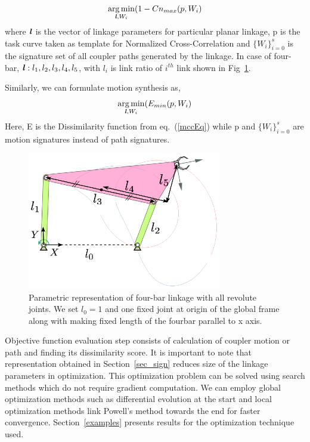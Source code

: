 \documentclass[twocolumn,10pt]{asme2e}
\newcommand{\req}[1]{(\ref{#1})}
\DeclareMathOperator*{\argminA}{arg\,min}
\begin{document}
\begin{equation}\label{objectiveFunPath}
  \argminA_{\textbf{\emph{l}}, W_i} (1 - Cn_{max}(p, W_i)
\end{equation}
where $\textbf{\emph{l}}$ is the vector of linkage parameters for particular planar linkage, p is the task curve taken as template for Normalized Cross-Correlation and ${\{W_i\}}_{i=0}^{s}$ is the signature set of all coupler paths generated by the linkage.
In case of four-bar, $\textbf{\emph{l}}: l_1, l_2, l_3, l_4, l_5$, with $l_i$ is link ratio of $i^{th}$ link shown in Fig~\ref{fourbar}.

Similarly, we can formulate motion synthesis as,
\begin{equation}\label{objectiveFunMotion}
  \argminA_{\textbf{\emph{l}}, W_i} (E_{min}(p, W_i)
\end{equation}
Here, E is the Dissimilarity function from eq.~\req{mccEq} while p and ${\{W_i\}}_{i=0}^{s}$ are motion signatures instead of path signatures.

\begin{figure}
\centering
\includegraphics[width=240pt]{figure/fig_fourbar.eps}
  \caption{Parametric representation of four-bar linkage with all revolute joints. We set $l_0 = 1$ and one fixed joint at origin of the global frame along with making fixed length of the fourbar parallel to x axis.}
\label{fourbar}
\end{figure}

Objective function evaluation step consists of calculation of coupler motion or path and finding its dissimilarity score.
It is important to note that representation obtained in Section~\ref{sec_sign} reduces size of the linkage parameters in optimization.
This optimization problem can be solved using search methods which do not require gradient computation.
We can employ global optimization methods such as differential evolution at the start and local optimization methods link Powell's method towards the end for faster convergence\cite{ullah1997}.
Section~\ref{examples} presents results for the optimization technique used.
\end{document}
